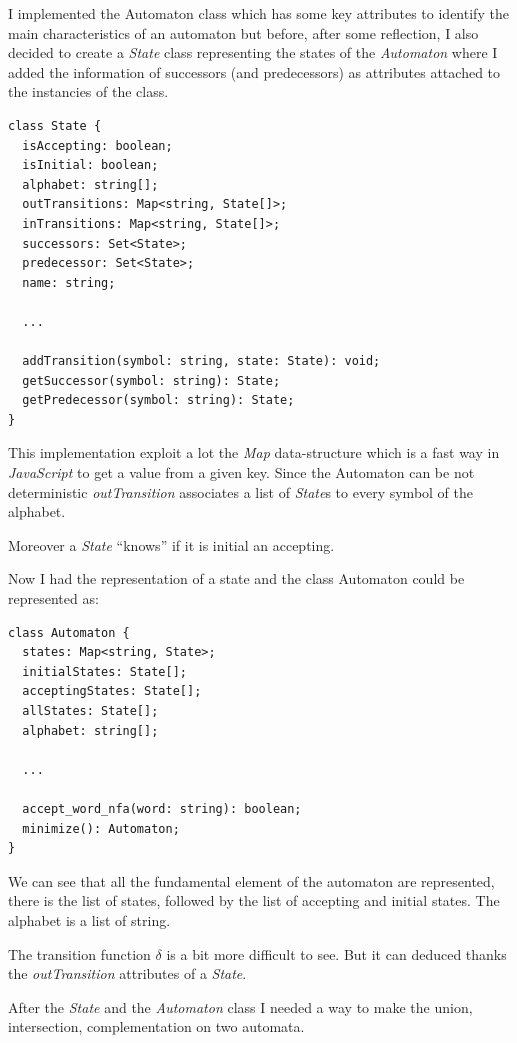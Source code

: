 I implemented the Automaton class which has some key attributes to identify the main characteristics of an automaton but before, after some reflection, I also decided to create a \textit{State} class representing the states of the \textit{Automaton} where I added the information of successors (and predecessors) as attributes attached to the instancies of the class.

\begin{verbatim}
class State {
  isAccepting: boolean;
  isInitial: boolean;
  alphabet: string[];
  outTransitions: Map<string, State[]>;
  inTransitions: Map<string, State[]>;
  successors: Set<State>;
  predecessor: Set<State>;
  name: string;

  ... 

  addTransition(symbol: string, state: State): void;
  getSuccessor(symbol: string): State;
  getPredecessor(symbol: string): State;
}
\end{verbatim}

This implementation exploit a lot the \textit{Map} data-structure which is a fast way in \textit{JavaScript} to get a value from a given key. Since the Automaton can be not deterministic \textit{outTransition} associates a list of \textit{State}s to every symbol of the alphabet.

Moreover a \textit{State} ``knows'' if it is initial an accepting.

Now I had the representation of a state and the class Automaton could be represented as:

\begin{verbatim}
class Automaton {
  states: Map<string, State>;
  initialStates: State[];
  acceptingStates: State[];
  allStates: State[];
  alphabet: string[];

  ... 

  accept_word_nfa(word: string): boolean;
  minimize(): Automaton;
}
\end{verbatim}

We can see that all the fundamental element of the automaton are represented, there is the list of states, followed by the list of accepting and initial states. The alphabet is a list of string.

The transition function $\delta$ is a bit more difficult to see. But it can deduced thanks the \textit{outTransition} attributes of a \textit{State}.

After the \textit{State} and the \textit{Automaton} class I needed a way to make the union, intersection, complementation on two automata.

